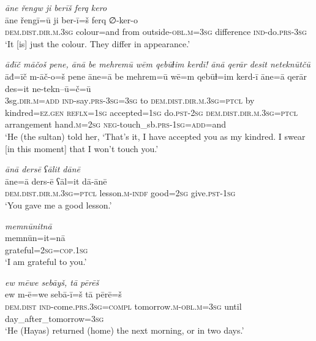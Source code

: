 \ea \label{ŽH.100}
\textit{āne řengw ji berīš ferq kero} \\ 
\gll āne řengī=ū ji ber-ī=š ferq ∅-ker-o \\ 
 \textsc{dem.dist}\textsc{.dir}\textsc{.m}\textsc{.3sg} colour=and from outside\textsc{-obl}\textsc{.m}\textsc{=3sg} difference \textsc{ind-}do\textsc{.prs}\textsc{-3sg} \\ 
\glt `It [is] just the colour. They differ in appearance.'
\z 
 
\ea \label{ŽH.103}
\textit{āđīč māčoš pene, ānā be mehremū wēm qebūɫim kerdī! ānā qerār desit neteknūtčū} \\ 
\gll āđ=īč m-āč-o=š pene āne=ā be mehrem=ū wē=m qebūɫ=im kerd-ī āne=ā qerār des=it ne-tekn--ū=č=ū \\ 
 3sg\textsc{.dir}\textsc{.m}\textsc{=add} \textsc{ind-}say\textsc{.prs}\textsc{-3sg}\textsc{=3sg} to \textsc{dem.dist}\textsc{.dir}\textsc{.m}\textsc{.3sg}=\textsc{ptcl} by kindred\textsc{=ez}\textsc{.gen} \textsc{reflx}\textsc{=1sg} accepted\textsc{=1sg} do\textsc{.pst}-\textsc{2sg} \textsc{dem.dist}\textsc{.dir}\textsc{.m}\textsc{.3sg}=\textsc{ptcl} arrangement hand\textsc{.m}\textsc{=\textsc{2sg}} \textsc{neg-}touch\_sb\textsc{.prs}\textsc{-1sg}\textsc{=add}=and \\ 
\glt `He (the sultan) told her, ‘That’s it, I have accepted you as my kindred. I swear [in this moment] that I won’t touch you.'
\z 
 
\ea \label{ŽH.104}
\textit{ānā dersē ʕālit dānē} \\ 
\gll āne=ā ders-ē ʕāl=it dā-ānē \\ 
 \textsc{dem.dist}\textsc{.dir}\textsc{.m}\textsc{.3sg}=\textsc{ptcl} lesson\textsc{.m}\textsc{-indf} good\textsc{=\textsc{2sg}} give\textsc{.pst}\textsc{-1sg} \\ 
\glt `You gave me a good lesson.'
\z 
 
\ea \label{ŽH.105}
\textit{memnūnitnā} \\ 
\gll memnūn=it=nā \\ 
 grateful\textsc{=\textsc{2sg}}\textsc{=cop}\textsc{.1sg} \\ 
\glt `I am grateful to you.'
\z 
 
\ea \label{ŽH.107}
\textit{ew mēwe sebāyš, tā pērēš} \\ 
\gll ew m-ē=we sebā-ī=š tā pērē=š \\ 
 \textsc{dem.dist} \textsc{ind-}come\textsc{.prs}\textsc{.3sg}\textsc{=compl} tomorrow\textsc{.m}\textsc{-obl}\textsc{.m}\textsc{=3sg} until day\_after\_tomorrow\textsc{=3sg} \\ 
\glt `He (Hayas) returned (home) the next morning, or in two days.'
\z 
 
